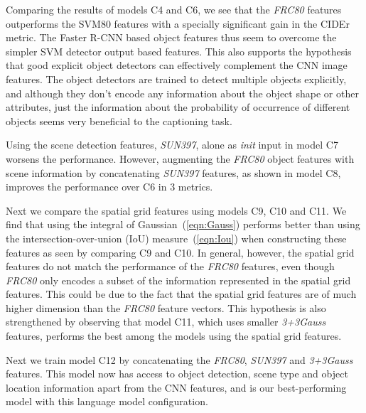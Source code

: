 Comparing the results of models C4 and C6, we see that the \emph{FRC80} features
outperforms the SVM80 features with a specially significant gain in the CIDEr
metric.
The Faster R-CNN based object features thus seem to overcome the simpler SVM
detector output based features.
This also supports the hypothesis that good explicit object detectors can
effectively complement the CNN image features. 
The object detectors are trained to detect multiple objects explicitly, and
although they don't encode any information about the object shape or other
attributes, just the information about the probability of occurrence of different
objects seems very beneficial to the captioning task.

Using the scene detection features, \emph{SUN397}, alone as \emph{init} input in
model C7 worsens the performance.
However, augmenting the \emph{FRC80} object features with scene information by
concatenating \emph{SUN397} features, as shown in model C8, improves the
performance over C6 in 3 metrics.

Next we compare the spatial grid features using models C9, C10 and C11.
We find that using the integral of Gaussian~(\ref{eqn:Gauss}) performs better
than using the intersection-over-union (IoU) measure~(\ref{eqn:Iou}) when
constructing these features as seen by comparing C9 and C10. 
In general, however, the spatial grid features do not match the performance of
the \emph{FRC80} features, even though \emph{FRC80} only encodes a subset of the
information represented in the spatial grid features.
This could be due to the fact that the spatial grid features are of much higher
dimension than the \emph{FRC80} feature vectors.
This hypothesis is also strengthened by observing that model C11, which uses
smaller \emph{3+3Gauss} features, performs the best among the models using the
spatial grid features.

Next we train model C12 by concatenating the \emph{FRC80}, \emph{SUN397}  and
\emph{3+3Gauss} features. 
This model now has access to object detection, scene type and object location
information apart from the CNN features, and is our best-performing model with
this language model configuration.

